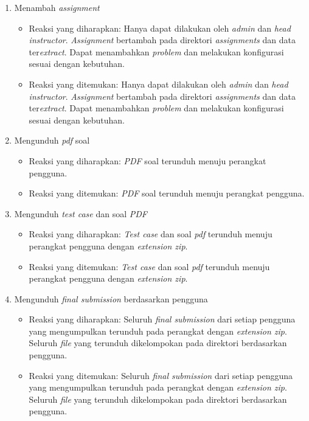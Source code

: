 \begin{enumerate}
\begin{itemize}
	 \end{itemize}
	 \item Menambah \textit{assignment}
	 \begin{itemize}
	 	\item Reaksi yang diharapkan: Hanya dapat dilakukan oleh \textit{admin} dan \textit{head instructor}. \textit{Assignment} bertambah pada direktori \textit{assignments} dan data ter\textit{extract}. Dapat menambahkan \textit{problem} dan melakukan konfigurasi sesuai dengan kebutuhan.
	 	\item Reaksi yang ditemukan: Hanya dapat dilakukan oleh \textit{admin} dan \textit{head instructor}. \textit{Assignment} bertambah pada direktori \textit{assignments} dan data ter\textit{extract}. Dapat menambahkan \textit{problem} dan melakukan konfigurasi sesuai dengan kebutuhan.
	 \end{itemize}
	 \item Mengunduh \textit{pdf} soal
	 \begin{itemize}
	 	\item Reaksi yang diharapkan: \textit{PDF} soal terunduh menuju perangkat pengguna.
	 	\item Reaksi yang ditemukan: \textit{PDF} soal terunduh menuju perangkat pengguna.
	 \end{itemize}
	 \item Mengunduh \textit{test case} dan soal \textit{PDF}
	 \begin{itemize}
	 	\item Reaksi yang diharapkan: \textit{Test case} dan soal \textit{pdf} terunduh menuju perangkat pengguna dengan \textit{extension zip}.
	 	\item Reaksi yang ditemukan: \textit{Test case} dan soal \textit{pdf} terunduh menuju perangkat pengguna dengan \textit{extension zip}.
	 \end{itemize}
	 \item Mengunduh \textit{final submission} berdasarkan pengguna
	 \begin{itemize}
	 	\item Reaksi yang diharapkan: Seluruh \textit{final submission} dari setiap pengguna yang mengumpulkan terunduh pada perangkat dengan \textit{extension zip}. Seluruh \textit{file} yang terunduh dikelompokan pada direktori berdasarkan pengguna.
	 	\item Reaksi yang ditemukan: Seluruh \textit{final submission} dari setiap pengguna yang mengumpulkan terunduh pada perangkat dengan \textit{extension zip}. Seluruh \textit{file} yang terunduh dikelompokan pada direktori berdasarkan pengguna.

\end{itemize}
\end{enumerate}
